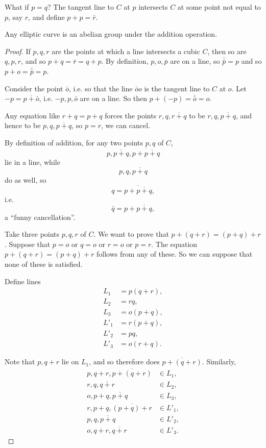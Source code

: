 What if \(p=q\)?
The tangent line to \(C\) at \(p\) intersects \(C\) at some point not equal to \(p\), say \(r\), and define \(p+p=\bar{r}\).

\begin{theorem}
Any elliptic curve is an abelian group under the addition operation.
\end{theorem}
\begin{proof}
If \(p,q,r\) are the points at which a line intersects a cubic \(C\), then so are \(q,p,r\), and so \(p+q=\bar{r}=q+p\).
By definition, \(p,o,\bar{p}\) are on a line, so \(\bar{\bar{p}}=p\) and so \(p+o=\bar{\bar{p}}=p\).

Consider the point \(\bar{o}\), i.e. so that the line \(\bar{o}o\) is the tangent line to \(C\) at \(o\).
Let \(-p=\overline{p+\bar{o}}\), i.e. \(-p,p,\bar{o}\) are on a line.
So then \(p+(-p)=\bar{\bar{o}}=o\).

Any equation like \(r+q=p+q\) forces the points \(r,q,\overline{r+q}\) to be \(r,q,\overline{p+q}\), and hence to be \(p,q,\overline{p+q}\), so \(p=r\), we can cancel.

By definition of addition, for any two points \(p,q\) of \(C\),
\[
p,\overline{p+q},\overline{p+\overline{p+q}}
\]
lie in a line, while 
\[
p,q,\overline{p+q}
\]
do as well, so 
\[
q=\overline{p+\overline{p+q}},
\]
i.e.
\[
\bar{q}=p+\overline{p+q},
\]
a ``funny cancellation''.

Take three points \(p,q,r\) of \(C\).
We want to prove that \(p+(q+r)=(p+q)+r\).
Suppose that \(p=o\) or \(q=o\) or \(r=o\) or \(p=r\).
The equation \(p+(q+r)=(p+q)+r\) follows from any of these.
So we can suppose that none of these is satisfied.

Define lines
\begin{align*}
L_1 &= p(q+r), \\
L_2 &= rq, \\
L_3 &= o(p+q), \\
L'_1 &= r(p+q), \\
L'_2 &= pq, \\
L'_3 &= o(r+q).
\end{align*}

Note that \(p,q+r\) lie on \(L_1\), and so therefore does \(\overline{p+(q+r)}\).
Similarly,
\begin{align*}
p,q+r,\overline{p+(q+r)} & \in L_1, \\
r,q,\overline{q+r} & \in L_2, \\
o,p+q,\overline{p+q} & \in L_3, \\
r,p+q,\overline{(p+q)+r} & \in L'_1, \\
p,q,\overline{p+q} & \in L'_2, \\
o,q+r,\overline{q+r} & \in L'_3.
\end{align*}


\end{proof}
